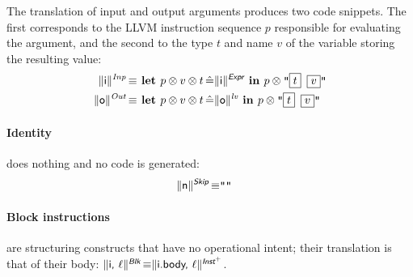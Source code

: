 \documentclass{llncs}
\newcommand{\trad}[2]{\ensuremath{\lVert \textsf{#1} \rVert^{\textit{#2}}}}
\DeclareMathOperator{\isdef}{\equiv}
\newcommand{\llvm}[1]{\texttt{#1}}
\newcommand{\B}[1]{\textsf{#1}}
\newcommand{\ListOf}[1]{$\mbox{#1}^+$}
\newcommand{\LET}[0]{\textbf{ let }}
\DeclareMathOperator{\BE}{\hat{=}}
\newcommand{\IN}[0]{\textbf{ in }}
\newcommand{\PH}[1]{\framebox{$#1$}}
\newcommand{\sep}[0]{\otimes}
\begin{document}
The translation of input and output arguments produces two code snippets. The
first corresponds to the LLVM instruction sequence $p$ responsible for
evaluating the argument, and the second to the type $t$ and name $v$ of the
variable storing the resulting value:
\begin{align*}
  \trad{i}{Inp} \isdef
  & \LET p \sep v \sep t \BE \trad{i}{\B{Expr}} \IN p \sep \llvm{"\PH{t} \PH{v}"}\\
  \trad{o}{Out} \isdef
  & \LET p \sep v \sep t \BE \trad{o}{lv} \IN p \sep \llvm{"\PH{t} \PH{v}"}
\end{align*}

\paragraph{Identity} does nothing and no code is generated:
\begin{align*}
\begin{split}
  \trad{n}{\B{Skip}} \isdef & \llvm{""}
\end{split}
\end{align*}

\paragraph{Block instructions} are structuring constructs that have no
operational intent; their translation is that of their body: $\trad{i,
  $\ell$}{\B{Blk}} \isdef \trad{i.body, $\ell$}{\ListOf{\B{Inst}}}$.
\end{document}

